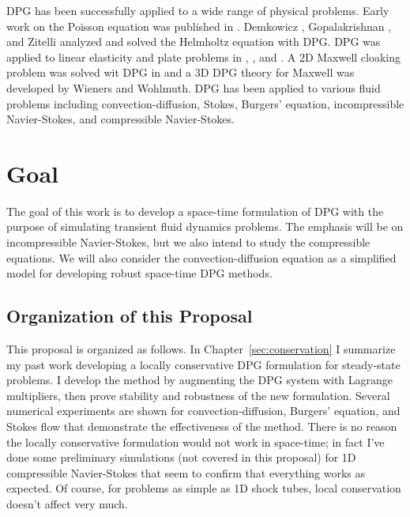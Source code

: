\documentclass[Proposal.tex]{subfiles}
\begin{document}
DPG has been successfully applied to a wide range of physical problems.
Early work on the Poisson equation was published in \cite{DPGPoisson}.
Demkowicz \etal\cite{DPGHelmholtz}, Gopalakrishnan \etal\cite{Gopalakrishnan2014}, and Zitelli \etal\cite{DPG4} 
analyzed and solved the Helmholtz equation with DPG.
DPG was applied to linear elasticity and plate problems in \cite{BramwellDPG}, \cite{NiemiBramwellDemkowicz10}, and \cite{BramwellDemkowiczQiu10}.
A 2D Maxwell cloaking problem was solved wit DPG in \cite{DPGCloaking} 
and a 3D DPG theory for Maxwell was developed by Wieners and Wohlmuth\cite{WohlmuthReport}.
DPG has been applied to various fluid problems including convection-diffusion\cite{DPG3,DemkowiczHeuer,ChanHeuerThanhDemkowicz2012,Chan2013,Ellis2013Report},
Stokes\cite{DPGStokes,Ellis2013Report}, Burgers' equation\cite{Chan2013dpg}, incompressible Navier-Stokes\cite{NateDissertation}, 
and compressible Navier-Stokes\cite{JesseDissertation}.

\section{Goal}
The goal of this work is to develop a space-time formulation of DPG with the purpose of simulating transient 
fluid dynamics problems.
The emphasis will be on incompressible Navier-Stokes, but we also intend to study the compressible equations.
We will also consider the convection-diffusion equation as a simplified model for developing robust space-time DPG methods.

\subsection{Organization of this Proposal}
This proposal is organized as follows. 
In Chapter~\ref{sec:conservation} I summarize my past work developing a locally conservative DPG formulation for steady-state problems.
I develop the method by augmenting the DPG system with Lagrange multipliers, then prove stability and robustness of the new formulation.
Several numerical experiments are shown for convection-diffusion, Burgers' equation, and Stokes flow that demonstrate the effectiveness of the method.
There is no reason the locally conservative formulation would not work in space-time; in fact I've done some preliminary simulations 
(not covered in this proposal) for 1D compressible Navier-Stokes that seem to confirm that everything works as expected. 
Of course, for problems as simple as 1D shock tubes, local conservation doesn't affect very much.
\end{document}
